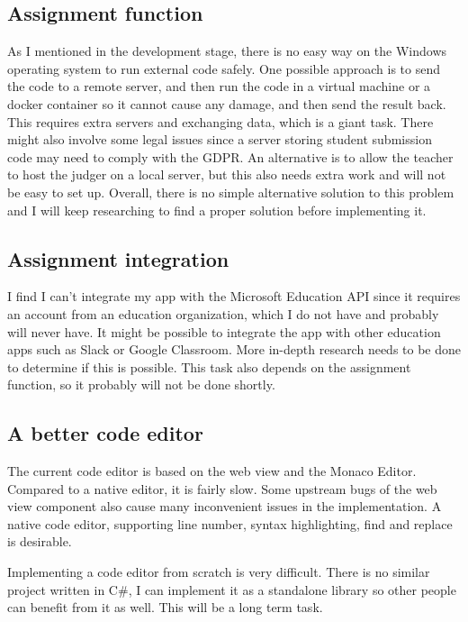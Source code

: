 \documentclass[report.tex]{subfiles}
\begin{document}
\subsection{Assignment function}

As I mentioned in the development stage, there is no easy way on the Windows operating system to run external code safely. One possible approach is to send the code to a remote server, and then run the code in a virtual machine or a docker container so it cannot cause any damage, and then send the result back. This requires extra servers and exchanging data, which is a giant task. There might also involve some legal issues since a server storing student submission code may need to comply with the GDPR. An alternative is to allow the teacher to host the judger on a local server, but this also needs extra work and will not be easy to set up. Overall, there is no simple alternative solution to this problem and I will keep researching to find a proper solution before implementing it.

\subsection{Assignment integration}

I find I can't integrate my app with the Microsoft Education API since it requires an account from an education organization, which I do not have and probably will never have. It might be possible to integrate the app with other education apps such as Slack or Google Classroom. More in-depth research needs to be done to determine if this is possible. This task also depends on the assignment function, so it probably will not be done shortly.

\subsection{A better code editor}

The current code editor is based on the web view and the Monaco Editor. Compared to a native editor, it is fairly slow. Some upstream bugs of the web view component also cause many inconvenient issues in the implementation. A native code editor, supporting line number, syntax highlighting, find and replace is desirable.

Implementing a code editor from scratch is very difficult. There is no similar project written in C\#, I can implement it as a standalone library so other people can benefit from it as well. This will be a long term task.
\end{document}

